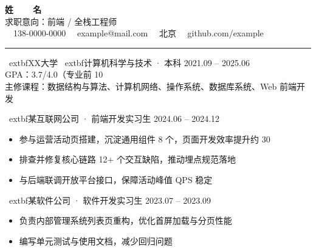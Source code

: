\documentclass[UTF8,a4paper,10.5pt]{ctexart}
\begin{document}
\begin{minipage}[c]{0.78\	extwidth}
  {\fontsize{24}{28}\selectfont\bfseries\sffamily 姓~~~~名}\\[0.35em]
  {\large\sffamily 求职意向：前端 / 全栈工程师}\\[0.25em]
  {\small
    \faPhone~~138-0000-0000 \quad
    \faEnvelope~~example@mail.com \quad
    \faMapMarker~~北京 \quad
    \faGithub~~github.com/example}
\end{minipage}\hfill
\begin{minipage}[c]{0.18\	extwidth}
  \centering
\end{minipage}

\vspace{0.4em}
{\color{accent}\rule{\	extwidth}{1.2pt}}
\vspace{0.6em}

\	extbf{XX大学} \hfill \	extbf{计算机科学与技术 · 本科} \hfill 2021.09 -- 2025.06 \\
GPA：3.7/4.0（专业前 10\\%
主修课程：数据结构与算法、计算机网络、操作系统、数据库系统、Web 前端开发

\vspace{0.35em}
\	extbf{某互联网公司 · 前端开发实习生} \hfill 2024.06 -- 2024.12 \\
\begin{itemize}
  \item 参与运营活动页搭建，沉淀通用组件 8 个，页面开发效率提升约 30\\%
  \item 排查并修复核心链路 12+ 个交互缺陷，推动埋点规范落地
  \item 与后端联调开放平台接口，保障活动峰值 QPS 稳定
\end{itemize}

\vspace{0.25em}
\	extbf{某软件公司 · 软件开发实习生} \hfill 2023.07 -- 2023.09 \\
\begin{itemize}
  \item 负责内部管理系统列表页重构，优化首屏加载与分页性能
  \item 编写单元测试与使用文档，减少回归问题
\end{itemize}
\end{document}
